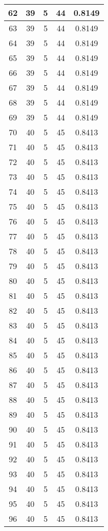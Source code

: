 \documentclass[letterpaper, 12pt]{article}
\begin{document}
\begin{longtable}{|c|c|c|c|c|}
\hline
62 & 39 & 5 & 44 & 0.8149 \\
\hline
63 & 39 & 5 & 44 & 0.8149 \\
\hline
64 & 39 & 5 & 44 & 0.8149 \\
\hline
65 & 39 & 5 & 44 & 0.8149 \\
\hline
66 & 39 & 5 & 44 & 0.8149 \\
\hline
67 & 39 & 5 & 44 & 0.8149 \\
\hline
68 & 39 & 5 & 44 & 0.8149 \\
\hline
69 & 39 & 5 & 44 & 0.8149 \\
\hline
70 & 40 & 5 & 45 & 0.8413 \\
\hline
71 & 40 & 5 & 45 & 0.8413 \\
\hline
72 & 40 & 5 & 45 & 0.8413 \\
\hline
73 & 40 & 5 & 45 & 0.8413 \\
\hline
74 & 40 & 5 & 45 & 0.8413 \\
\hline
75 & 40 & 5 & 45 & 0.8413 \\
\hline
76 & 40 & 5 & 45 & 0.8413 \\
\hline
77 & 40 & 5 & 45 & 0.8413 \\
\hline
78 & 40 & 5 & 45 & 0.8413 \\
\hline
79 & 40 & 5 & 45 & 0.8413 \\
\hline
80 & 40 & 5 & 45 & 0.8413 \\
\hline
81 & 40 & 5 & 45 & 0.8413 \\
\hline
82 & 40 & 5 & 45 & 0.8413 \\
\hline
83 & 40 & 5 & 45 & 0.8413 \\
\hline
84 & 40 & 5 & 45 & 0.8413 \\
\hline
85 & 40 & 5 & 45 & 0.8413 \\
\hline
86 & 40 & 5 & 45 & 0.8413 \\
\hline
87 & 40 & 5 & 45 & 0.8413 \\
\hline
88 & 40 & 5 & 45 & 0.8413 \\
\hline
89 & 40 & 5 & 45 & 0.8413 \\
\hline
90 & 40 & 5 & 45 & 0.8413 \\
\hline
91 & 40 & 5 & 45 & 0.8413 \\
\hline
92 & 40 & 5 & 45 & 0.8413 \\
\hline
93 & 40 & 5 & 45 & 0.8413 \\
\hline
94 & 40 & 5 & 45 & 0.8413 \\
\hline
95 & 40 & 5 & 45 & 0.8413 \\
\hline
96 & 40 & 5 & 45 & 0.8413 \\

\end{longtable}
\end{document}
